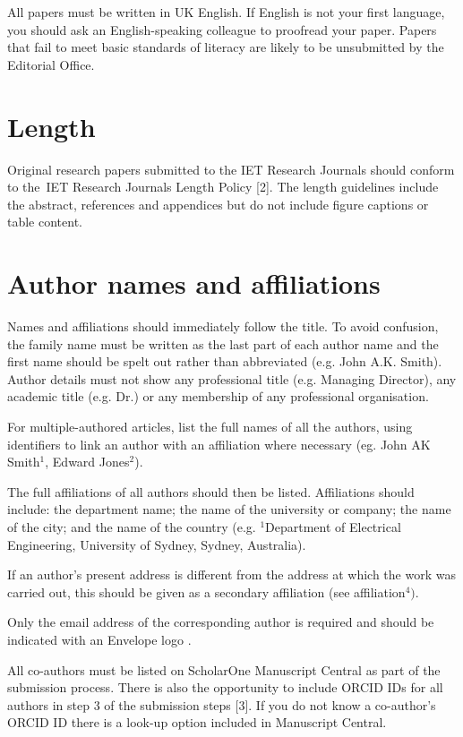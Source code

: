 \documentclass{cta-author}
\begin{document}
All papers must be written in UK English. If English is not
your first language, you should ask an English-speaking
colleague to proofread your paper. Papers that fail to meet
basic standards of literacy are likely to be unsubmitted by
the Editorial Office.

\section{Length}\label{sec3}

Original research papers submitted to the IET Research
Journals should conform to the~IET Research Journals Length
Policy [2]. The length guidelines include the
abstract, references and appendices but do not include
figure captions or table content.

\section{Author names and affiliations}\label{sec4}

Names and affiliations should immediately follow the title.
To avoid confusion, the family name must be written as the
last part of each author name and the first name should be
spelt out rather than abbreviated (e.g. John A.K. Smith).
Author details must not show any professional title (e.g.
Managing Director), any academic title (e.g. Dr.) or any
membership of any professional organisation.

For multiple-authored articles, list the full names of all
the authors, using identifiers to link an author with an
affiliation where necessary (eg. John AK Smith$^{1}$,
Edward Jones$^{2}$).

The full affiliations of all authors should then be listed.
Affiliations should include: the department name; the name
of the university or company; the name of the city; and the
name of the country (e.g. $^{1}$Department of Electrical
Engineering, University of Sydney, Sydney, Australia).

If an author's present address is different from the
address at which the work was carried out, this should be
given as a secondary affiliation (see affiliation$^{4})$.

Only the email address of the corresponding author is
required and should be indicated with an Envelope logo \correnvelope.

All co-authors must be listed on ScholarOne Manuscript
Central as part of the submission process. There is also
the opportunity to include ORCID IDs for all authors in
step 3 of the submission steps [3]. If you do not know
a co-author's ORCID ID there is a look-up option included
in Manuscript Central.
\end{document}
